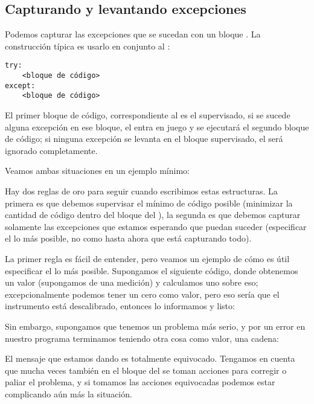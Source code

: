 \subsection{Capturando y levantando excepciones} 

Podemos capturar las excepciones que se sucedan con un bloque . La construcción típica es usarlo en conjunto al :

\begin{verbatim}
try:
    <bloque de código>
except:
    <bloque de código>
\end{verbatim}

El primer bloque de código, correspondiente al  es el supervisado, si se sucede alguna excepción en ese bloque, el  entra en juego y se ejecutará el segundo bloque de código; si ninguna excepción se levanta en el bloque supervisado, el  será ignorado completamente.

Veamos ambas situaciones en un ejemplo mínimo:


Hay dos reglas de oro para seguir cuando escribimos estas estructuras. La primera es que debemos supervisar el mínimo de código posible (minimizar la cantidad de código dentro del bloque del ), la segunda es que debemos capturar solamente las excepciones que estamos esperando que puedan suceder (especificar el  lo más posible, no como hasta ahora que está capturando todo).

La primer regla es fácil de entender, pero veamos un ejemplo de cómo es útil especificar el  lo más posible. Supongamos el siguiente código, donde obtenemos un valor (supongamos de una medición) y calculamos uno sobre eso; excepcionalmente podemos tener un cero como valor, pero eso sería que el instrumento está descalibrado, entonces lo informamos y listo:


Sin embargo, supongamos que tenemos un problema más serio, y por un error en nuestro programa terminamos teniendo otra cosa como valor, una cadena:


El mensaje que estamos dando es totalmente equivocado. Tengamos en cuenta que mucha veces también en el bloque del  se toman acciones para corregir o paliar el problema, y si tomamos las acciones equivocadas podemos estar complicando aún más la situación.


